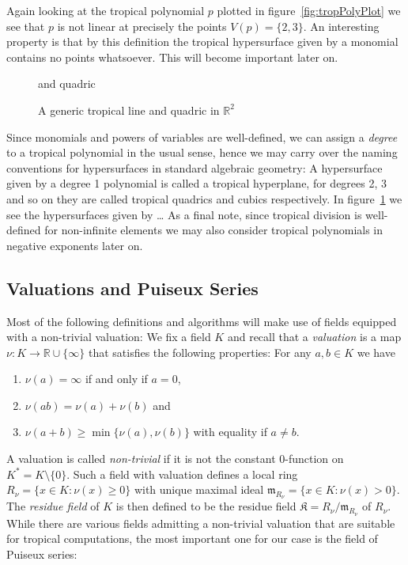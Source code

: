 \documentclass[
  paper=a4,
  titlepage,
  bibliography=totoc,
  listof=totoc,
  pagesize=pdftex
]{scrartcl}
\numberwithin{figure}{section}
\numberwithin{equation}{section}
\numberwithin{table}{section}
\newcommand*\setR{\mathds{R}}
\theoremstyle{definition}
\numberwithin{definition}{section}
\begin{document}
Again looking at the tropical polynomial $p$ plotted in figure~\ref{fig:tropPolyPlot} we
see that $p$ is not linear at precisely the points $V(p) = \{ 2, 3 \}$. An interesting
property is that by this definition the tropical hypersurface given by a monomial contains
no points whatsoever. This will become important later on.

\begin{figure}[tbh]
  \centering
  and quadric
  \caption{A generic tropical line and quadric in $\setR^2$}
  \label{fig:tropLineQuad}
\end{figure}

Since monomials and powers of variables are well-defined, we can assign a \emph{degree} to
a tropical polynomial in the usual sense, hence we may carry over the naming conventions
for hypersurfaces in standard algebraic geometry: A hypersurface given by a degree 1
polynomial is called a tropical hyperplane, for degrees 2, 3 and so on they are called
tropical quadrics and cubics respectively. In figure~\ref{fig:tropLineQuad} we see the
hypersurfaces given by \dots %
As a final note, since tropical division is well-defined for non-infinite elements we may
also consider tropical polynomials in negative exponents later on.

\subsection{Valuations and Puiseux Series}

Most of the following definitions and algorithms will make use of fields equipped with a
non-trivial valuation: We fix a field $K$ and recall that a \emph{valuation} is a map
$\nu:K\to \setR \cup \{\infty\}$ that satisfies the following properties: For any $a, b
\in K$ we have
\begin{enumerate}
  \item $\nu(a) = \infty$ if and only if $a=0$,
  \item $\nu(ab) = \nu(a)+\nu(b)$ and
  \item $\nu(a+b) \geq \min\{\nu(a), \nu(b)\}$ with equality if $a\neq b$.
\end{enumerate}
A valuation is called \emph{non-trivial} if it is not the constant 0-function on $K^* =
K\setminus\{0\}$. Such a field with valuation defines a local ring $R_\nu = \{ x \in K :
\nu(x) \geq 0 \}$ with unique maximal ideal $\mathfrak m_{R_\nu} = \{ x \in K : \nu(x) > 0
\}$. The \emph{residue field} of $K$ is then defined to be the residue field $\mathfrak K
= R_\nu/\mathfrak m_{R_\nu}$ of $R_\nu$.
While there are various fields admitting a non-trivial valuation that
are suitable for tropical computations, the most important one for our case is the field
of Puiseux series:
\end{document}
